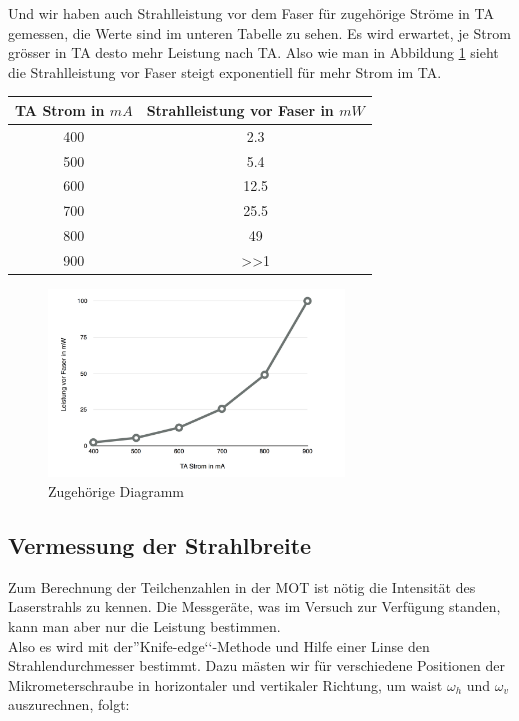 \documentclass[12pt,a4paper]{article}
\begin{document}
Und wir haben auch Strahlleistung vor dem Faser für zugehörige Ströme in TA gemessen, die Werte sind im  unteren Tabelle zu sehen. Es wird  erwartet, je Strom grösser in TA  desto mehr Leistung nach TA. Also wie man in Abbildung \ref{TA} sieht die Strahlleistung vor Faser steigt exponentiell für mehr Strom im TA.\\
\begin{center}
 \begin{tabular}{|c|c|}\hline
 TA Strom in $mA$&Strahlleistung vor Faser in $mW$\\ \hline \hline
400&2.3\\ \hline
500&5.4\\ \hline
600&12.5\\ \hline
700&25.5\\ \hline
800&49\\ \hline
900& >>1\\ \hline
\end{tabular}
\end{center}

    \begin{figure}[h!]
  \centering
  \includegraphics[width=0.7\textwidth]{TA.png}
  \caption{Zugehörige Diagramm}
  \label{TA}
  \end{figure}
  \subsection{Vermessung der Strahlbreite}
  Zum Berechnung der Teilchenzahlen in der MOT ist nötig die Intensität des Laserstrahls zu kennen. Die Messgeräte, was im Versuch zur Verfügung standen, kann man aber nur die Leistung bestimmen.\\
  Also es wird mit der''Knife-edge‘‘-Methode und Hilfe einer Linse den Strahlendurchmesser bestimmt. Dazu mästen wir für verschiedene Positionen der Mikrometerschraube in horizontaler und vertikaler Richtung, um waist $\omega_h$ und $\omega_v$ auszurechnen, folgt:\\
  
\end{document}
